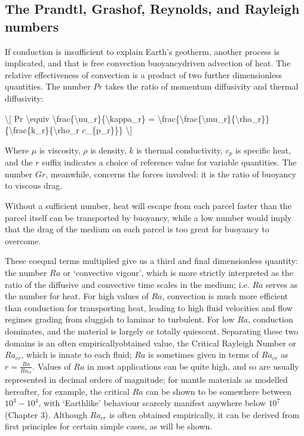 \documentclass[letterpaper,10pt,english]{jupyterBook}
\begin{document}
\subsection{The Prandtl, Grashof, Reynolds, and Rayleigh numbers}
\label{\detokenize{content/chapter_02_methods/section1:the-prandtl-grashof-reynolds-and-rayleigh-numbers}}
\sphinxAtStartPar
If conduction is insufficient to explain Earth’s geotherm, another process is implicated, and that is free convection \sphinxhyphen{} buoyancy\sphinxhyphen{}driven advection of heat. The relative effectiveness of convection is a product of two further dimensionless quantities. The  number \(Pr\) takes the ratio of momentum diffusivity and thermal diffusivity:

\sphinxAtStartPar
\textbackslash{}{[} Pr \textbackslash{}equiv \textbackslash{}frac\{\textbackslash{}nu\_r\}\{\textbackslash{}kappa\_r\} = \textbackslash{}frac\{\textbackslash{}frac\{\textbackslash{}mu\_r\}\{\textbackslash{}rho\_r\}\}\{\textbackslash{}frac\{k\_r\}\{\textbackslash{}rho\_r c\_\{p\_r\}\}\} \textbackslash{}{]}

\sphinxAtStartPar
Where \(\mu\) is viscosity, \(\rho\) is density, \(k\) is thermal conductivity, \(c_p\) is specific heat, and the \(r\) suffix indicates a choice of reference value for variable quantities. The  number \(Gr\), meanwhile, concerns the forces involved: it is the ratio of buoyancy to viscous drag.

\sphinxAtStartPar
Without a sufficient  number, heat will escape from each parcel faster than the parcel itself can be transported by buoyancy, while a low  number would imply that the drag of the medium on each parcel is too great for buoyancy to overcome.

\sphinxAtStartPar
These co\sphinxhyphen{}equal terms multiplied give us a third and final dimensionless quantity: the  number \(Ra\) or ‘convective vigour’, which is more strictly interpreted as the ratio of the diffusive and convective time scales in the medium; i.e. \(Ra\) serves as the  number for heat. For high values of \(Ra\), convection is much more efficient than conduction for transporting heat, leading to high fluid velocities and flow regimes grading from sluggish to laminar to turbulent. For low \(Ra\), conduction dominates, and the material is largely or totally quiescent. Separating these two domains is an often empirically\sphinxhyphen{}obtained value, the Critical Rayleigh Number or \(Ra_{cr}\), which is innate to each fluid; \(Ra\) is sometimes given in terms of \(Ra_{cr}\) as \(r = \frac{Ra}{Ra_{cr}}\). Values of \(Ra\) in most applications can be quite high, and so are usually represented in decimal orders of magnitude; for mantle materials as modelled hereafter, for example, the critical \(Ra\) can be shown to be somewhere between \(10^3-10^4\), with ‘Earthlike’ behaviour scarcely manifest anywhere below \(10^7\) (Chapter 3). Although \(Ra_{cr}\) is often obtained empirically, it can be derived from first principles for certain simple cases, as will be shown.
\end{document}
